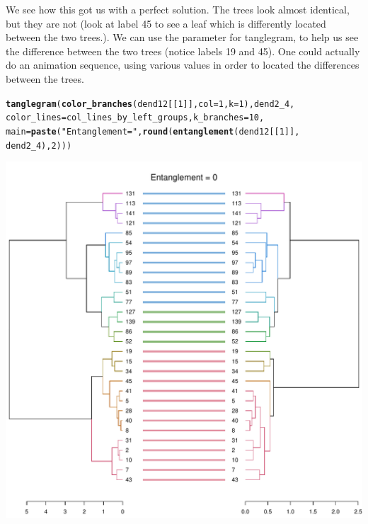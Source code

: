 \documentclass[shortnames,nojss,article]{jss}\usepackage[]{graphicx}\usepackage[]{color}
\makeatletter
\def\maxwidth{ %
  \ifdim\Gin@nat@width>\linewidth
    \linewidth
  \else
    \Gin@nat@width
  \fi
}
\newcommand{\hlnum}[1]{\textcolor[rgb]{0.686,0.059,0.569}{#1}}%
\newcommand{\hlstr}[1]{\textcolor[rgb]{0.192,0.494,0.8}{#1}}%
\newcommand{\hlstd}[1]{\textcolor[rgb]{0.345,0.345,0.345}{#1}}%
\newcommand{\hlkwc}[1]{\textcolor[rgb]{0.333,0.667,0.333}{#1}}%
\newcommand{\hlkwd}[1]{\textcolor[rgb]{0.737,0.353,0.396}{\textbf{#1}}}%
\newenvironment{kframe}{%
 \def\at@end@of@kframe{}%
 \ifinner\ifhmode%
  \def\at@end@of@kframe{\end{minipage}}%
  \begin{minipage}{\columnwidth}%
 \fi\fi%
 \def\FrameCommand##1{\hskip\@totalleftmargin \hskip-\fboxsep
 \colorbox{shadecolor}{##1}\hskip-\fboxsep
     \hskip-\linewidth \hskip-\@totalleftmargin \hskip\columnwidth}%
 \MakeFramed {\advance\hsize-\width
   \@totalleftmargin\z@ \linewidth\hsize
   \@setminipage}}%
 {\par\unskip\endMakeFramed%
 \at@end@of@kframe}
\newenvironment{knitrout}{}{} %
\makeatother
\begin{document}
We see how this got us with a perfect solution. The trees look almost identical, but they are not (look at label 45 to see a leaf which is differently located between the two trees.). We can use the  parameter for tanglegram, to help us see the difference between the two trees (notice labels 19 and 45). One could actually do an animation sequence, using various  values in order to located the differences between the trees.

\begin{knitrout}
\color{fgcolor}\begin{kframe}
\begin{alltt}
\hlkwd{tanglegram}\hlstd{(}\hlkwd{color_branches}\hlstd{(dend12[[}\hlnum{1}\hlstd{]],} \hlkwc{col} \hlstd{=} \hlnum{1}\hlstd{,} \hlkwc{k} \hlstd{=} \hlnum{1}\hlstd{), dend2_4,}
    \hlkwc{color_lines} \hlstd{= col_lines_by_left_groups,} \hlkwc{k_branches} \hlstd{=} \hlnum{10}\hlstd{,}
    \hlkwc{main} \hlstd{=} \hlkwd{paste}\hlstd{(}\hlstr{"Entanglement ="}\hlstd{,} \hlkwd{round}\hlstd{(}\hlkwd{entanglement}\hlstd{(dend12[[}\hlnum{1}\hlstd{]],}
        \hlstd{dend2_4),} \hlnum{2}\hlstd{)))}
\end{alltt}
\end{kframe}

{\centering \includegraphics[width=\maxwidth]{figure/unnamed-chunk-39} 

}



\end{knitrout}
\end{document}
